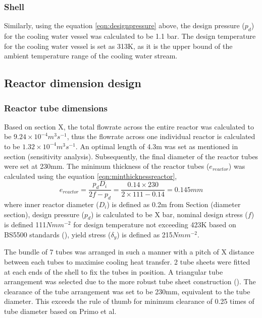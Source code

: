 \subsubsection{Shell}
Similarly, using the equation \ref{eqn:designpressure} above, the design pressure ($p_d$) for the cooling water vessel was calculated to be 1.1 bar. The design temperature for the cooling water vessel is set as 313K, as it is the upper bound of the ambient temperature range of the cooling water stream. 

\subsection{Reactor dimension design}
\label{sec:reactordimensions}

\subsubsection{Reactor tube dimensions}
Based on section X, the total flowrate across the entire reactor was calculated to be $9.24 \times 10^{-4} m^3s^{-1}$, thus the flowrate across one individual reactor is calculated to be  $1.32 \times 10^{-4} m^3s^{-1}$. An optimal length of 4.3m was set as mentioned in section (sensitivity analysis). Subsequently, the final diameter of the reactor tubes were set at 230mm.  
The minimum thickness of the reactor tubes ($e_{reactor}$) was calculated using the equation \ref{eqn:minthicknessreactor},
\begin{equation}
    e_{reactor} = \frac{p_dD_i}{2f-p_d} = \frac{0.14 \times 230}{2 \times 111 - 0.14} = 0.145mm
    \label{eqn:minthicknessreactor}
\end{equation}
where inner reactor diameter ($D_i$) is defined as 0.2m from Section (diameter section), design pressure ($p_d$) is calculated to be X bar, nominal design stress ($f$) is defined 111$Nmm^{-2}$ for design temperature not exceeding 423K based on BS5500 standards (), yield stress ($\delta_y$) is defined as 215$Nmm^{-2}$. 

The bundle of 7 tubes was arranged in such a manner with a pitch of X distance between each tubes to maximise cooling heat transfer. 2 tube sheets were fitted at each ends of the shell to fix the tubes in position. A triangular tube arrangement was selected due to the more robust tube sheet construction (). The clearance of the tube arrangement was set to be 230mm, equivalent to the tube diameter. This exceeds the rule of thumb for minimum clearance of 0.25 times of tube diameter based on Primo et al. 




